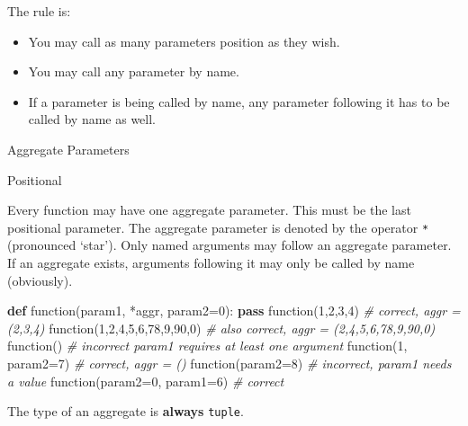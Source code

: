 \documentclass[ignorenonframetext,]{beamer}
\newenvironment{Shaded}{}{}
\newcommand{\KeywordTok}[1]{\textcolor[rgb]{0.00,0.44,0.13}{\textbf{{#1}}}}
\newcommand{\DecValTok}[1]{\textcolor[rgb]{0.25,0.63,0.44}{{#1}}}
\newcommand{\CommentTok}[1]{\textcolor[rgb]{0.38,0.63,0.69}{\textit{{#1}}}}
\newcommand{\NormalTok}[1]{{#1}}
\begin{document}
\begin{frame}

The rule is:

\begin{itemize}
\itemsep1pt\parskip0pt
\item
  You may call as many parameters position as they wish.
\item
  You may call any parameter by name.
\item
  If a parameter is being called by name, any parameter following it has
  to be called by name as well.
\end{itemize}

\end{frame}

\begin{frame}{Aggregate Parameters}

\end{frame}

\begin{frame}

\begin{block}{Positional}

Every function may have one aggregate parameter. This must be the last
positional parameter. The aggregate parameter is denoted by the operator
\texttt{*} (pronounced `star'). Only named arguments may follow an
aggregate parameter. If an aggregate exists, arguments following it may
only be called by name (obviously).

\end{block}

\end{frame}

\begin{frame}[fragile]

\begin{Shaded}
\begin{Highlighting}[]
\KeywordTok{def} \NormalTok{function(param1, *aggr, param2=}\DecValTok{0}\NormalTok{):}
    \KeywordTok{pass}
\NormalTok{function(}\DecValTok{1}\NormalTok{,}\DecValTok{2}\NormalTok{,}\DecValTok{3}\NormalTok{,}\DecValTok{4}\NormalTok{)  }\CommentTok{# correct, aggr = (2,3,4)}
\NormalTok{function(}\DecValTok{1}\NormalTok{,}\DecValTok{2}\NormalTok{,}\DecValTok{4}\NormalTok{,}\DecValTok{5}\NormalTok{,}\DecValTok{6}\NormalTok{,}\DecValTok{78}\NormalTok{,}\DecValTok{9}\NormalTok{,}\DecValTok{90}\NormalTok{,}\DecValTok{0}\NormalTok{)  }
\CommentTok{# also correct, aggr = (2,4,5,6,78,9,90,0)}
\NormalTok{function()  }\CommentTok{# incorrect param1 requires at least one argument}
\NormalTok{function(}\DecValTok{1}\NormalTok{, param2=}\DecValTok{7}\NormalTok{)  }\CommentTok{# correct, aggr = ()}
\NormalTok{function(param2=}\DecValTok{8}\NormalTok{)  }\CommentTok{# incorrect, param1 needs a value}
\NormalTok{function(param2=}\DecValTok{0}\NormalTok{, param1=}\DecValTok{6}\NormalTok{)  }\CommentTok{# correct}
\end{Highlighting}
\end{Shaded}

The type of an aggregate is \textbf{always} \texttt{tuple}.

\end{frame}
\end{document}

